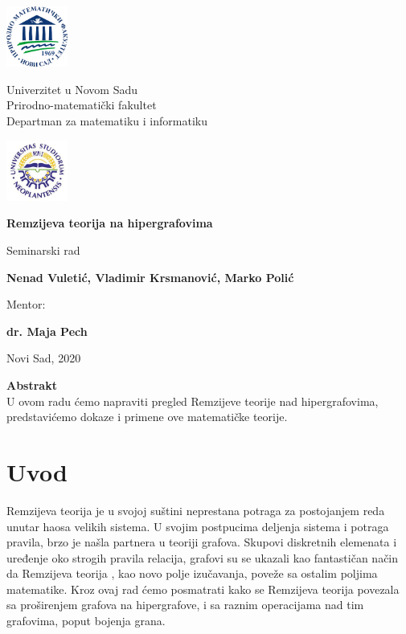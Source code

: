 \documentclass[a4paper]{article}
\newcommand{\autor}{ \centering Nenad Vuletić, Vladimir Krsmanović, Marko Polić}
\newcommand{\naslov}{Remzijeva teorija na hipergrafovima}
\newcommand{\datum}{Novi Sad, 2020}
\newcommand{\mentor}{dr. Maja Pech}
\begin{document}
	\begin{center}
		
		\includegraphics[width=2cm]{grbPMF}\hfill
		\parbox[b]{45ex}{\centering 
			Univerzitet u Novom Sadu\\
			Prirodno-matematički fakultet\\
			Departman za matematiku i informatiku}\hfill 
		\includegraphics[width=2cm]{grbUNS}
		
		\vspace{22ex}
				
		{\Huge {\bf \setlength{\baselineskip}{1.5\baselineskip}\naslov}}
		
		\vspace{4ex}
		Seminarski rad
		
		\vspace{12ex}
		\parbox[b]{\textwidth}{{\Large {\bf \hspace{1cm}\autor}}}
		\vspace{10ex}
		
		{\Large Mentor:}
		
		{\Large  \textbf{\mentor}}
		
		\vfill
		
		\datum
		
	\end{center}
	\thispagestyle{empty}
	\newpage	
	\vfill
	\begin{center}
		\textbf{Abstrakt}\\
		U ovom radu ćemo napraviti pregled Remzijeve teorije nad hipergrafovima, predstavićemo dokaze i primene ove matematičke teorije.
		\thispagestyle{empty}
	\end{center}
	\vspace{15ex}
	\tableofcontents
	\newpage
	\section{Uvod}
	Remzijeva teorija je u svojoj suštini neprestana potraga za postojanjem reda unutar haosa velikih sistema. U svojim postpucima deljenja sistema i potraga pravila, brzo je našla partnera u teoriji grafova. Skupovi diskretnih elemenata i uređenje oko strogih pravila relacija, grafovi su se ukazali kao fantastičan način da Remzijeva teorija , kao novo polje izučavanja, poveže sa ostalim poljima matematike. Kroz ovaj rad ćemo posmatrati kako se Remzijeva teorija povezala sa proširenjem grafova na hipergrafove, i sa raznim operacijama nad tim grafovima, poput bojenja grana.
\end{document}
